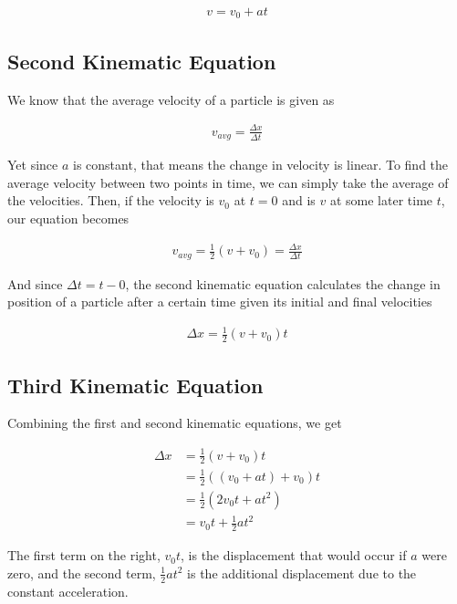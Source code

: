 \documentclass[11pt]{report}
\begin{document}
\begin{align*}
    v = v_{0} + at
\end{align*}

\subsection{Second Kinematic Equation}

We know that the average velocity of a particle is given as

\begin{align*}
    v_{avg} = \frac{\Delta x}{\Delta t}
\end{align*}

Yet since $a$ is constant, that means the change in velocity is linear. To find the average velocity between two points in time, we can simply take the average of the velocities. Then, if the velocity is $v_{0}$ at $t = 0$ and is $v$ at some later time $t$, our equation becomes

\begin{align*}
    v_{avg} = \frac{1}{2}(v + v_{0}) = \frac{\Delta x}{\Delta t}
\end{align*}

And since $\Delta t = t - 0$, the second kinematic equation calculates the change in position of a particle after a certain time given its initial and final velocities

\begin{align*}
    \Delta x = \frac{1}{2}(v + v_{0})t
\end{align*}

\subsection{Third Kinematic Equation}

Combining the first and second kinematic equations, we get

\begin{align*}
    \Delta x &= \frac{1}{2}(v + v_{0})t \\
             &= \frac{1}{2}((v_{0} + at) + v_{0})t \\
             & = \frac{1}{2}(2v_{0}t + at^{2}) \\
             & = v_{0}t + \frac{1}{2}at^{2}
\end{align*}

The first term on the right, $v_{0}t$, is the displacement that would occur if $a$ were zero, and the second term, $\frac{1}{2}at^{2}$ is the additional displacement due to the constant acceleration.
\end{document}
